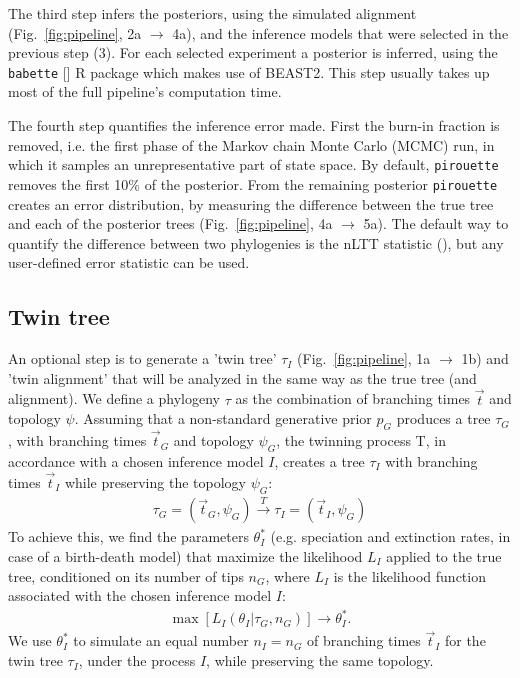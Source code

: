 The third step infers the posteriors,
using the simulated alignment (Fig.~\ref{fig:pipeline}, 2a $\rightarrow$ 4a),
and the inference models that were selected in the previous step (3). 
For each selected experiment a posterior is inferred, using the 
\verb;babette; [\cite{bilderbeek2018babette}] R package which makes use of BEAST2. 
This step usually takes up most of the full pipeline's computation time.

The fourth step quantifies the inference error made. First the burn-in fraction is removed, i.e. the first phase of the Markov chain Monte Carlo (MCMC) run,
in which it samples an unrepresentative part of state space. By default, \verb;pirouette; 
removes the first 10\% of the posterior.
From the remaining posterior \verb;pirouette; 
creates an error distribution, by measuring the difference
between the true tree and each of the posterior 
trees (Fig.~\ref{fig:pipeline}, 4a $\rightarrow$ 5a).
The default way to quantify the difference between two phylogenies
is the nLTT statistic (\cite{janzen2015approximate}), but any 
user-defined error statistic can be used.

\subsection{Twin tree}\label{subsec:twinning}

An optional step is to generate a 'twin tree' $\tau_{I}$
(Fig.~\ref{fig:pipeline}, 1a $\rightarrow$ 1b)
and 'twin alignment'
that will be analyzed in the same way as the true tree (and alignment).
We define a phylogeny $\tau$ as the combination of
branching times $\Vec{t}$ and topology $\psi$.
Assuming that a non-standard generative prior $\mathit{p_{G}}$
produces a tree $\tau_{\mathit{G}}$,
with branching times $\Vec{t}_{\mathit{G}}$ and 
topology $\psi_{\mathit{G}}$, the twinning process T, in accordance with a chosen inference 
model $\mathit{I}$, creates a tree $\tau_{\mathit{I}}$
with branching times $\Vec{t}_{\mathit{I}}$ while preserving the 
topology $\psi_{\mathit{G}}$:
\begin{align}
  \tau_{\mathit{G}} = (\Vec{t}_{\mathit{G}}, \psi_{\mathit{G}}) 
  \xrightarrow[]{\mathit{T}} 
  \tau_{\mathit{I}} = (\Vec{t}_{\mathit{I}}, \psi_{\mathit{G}})
\end{align}
To achieve this, we find the parameters $\theta^{*}_{\mathit{I}}$ 
(e.g. speciation and extinction rates, in case of a birth-death model) 
that maximize the likelihood $L_{\mathit{I}}$ applied 
to the true tree, conditioned on its number of tips $n_{\mathit{G}}$,
where $L_{\mathit{I}}$ is the likelihood function  
associated with the chosen inference model $\mathit{I}$:
\begin{align}
    \max[L_{\mathit{I}}(\theta_{\mathit{I}}|\tau_{\mathit{G}}, n_{\mathit{G}})] 
\rightarrow \theta^{*}_{\mathit{I}}.
\end{align}
We use $\theta^{*}_{\mathit{I}}$ to simulate an equal number 
$n_{\mathit{I}} = n_{\mathit{G}}$ 
of branching times $\Vec{t}_{\mathit{I}}$ for the twin tree 
$\tau_{\mathit{I}}$, under the process $\mathit{I}$, 
while preserving the same topology.

